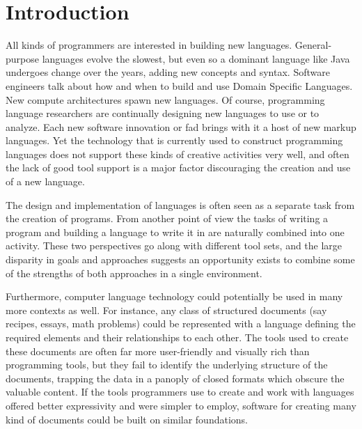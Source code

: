 \chapter{Introduction}


All kinds of programmers are interested in building new languages. General-purpose languages evolve the slowest, but even so a dominant language like Java undergoes change over the years, adding new concepts and syntax.\cite{java-generics} Software engineers talk about how and when to build and use Domain Specific Languages.\cite{fowler} New compute architectures spawn new languages.\cite{ctm}\cite{cuda}\cite{opencl} Of course, programming language researchers are continually designing new languages to use or to analyze. Each new software innovation or fad brings with it a host of new markup languages. Yet the technology that is currently used to construct programming languages does not support these kinds of creative activities very well, and often the lack of good tool support is a major factor discouraging the creation and use of a new language.

The design and implementation of languages is often seen as a separate task from the creation of programs\cite{ward}\cite{intentional}. From another point of view the tasks of writing a program and building a language to write it in are naturally combined into one activity\cite{on-lisp}. These two perspectives go along with different tool sets, and the large disparity in goals and approaches suggests an opportunity exists to combine some of the strengths of both approaches in a single environment.

Furthermore, computer language technology could potentially be used in many more contexts as well. For instance, any class of structured documents (say recipes, essays, math problems) could be represented with a language defining the required elements and their relationships to each other. The tools used to create these documents are often far more user-friendly and visually rich than programming tools, but they fail to identify the underlying structure of the documents, trapping the data in a panoply of closed formats which obscure the valuable content. If the tools programmers use to create and work with languages offered better expressivity and were simpler to employ, software for creating many kind of documents could be built on similar foundations. 




